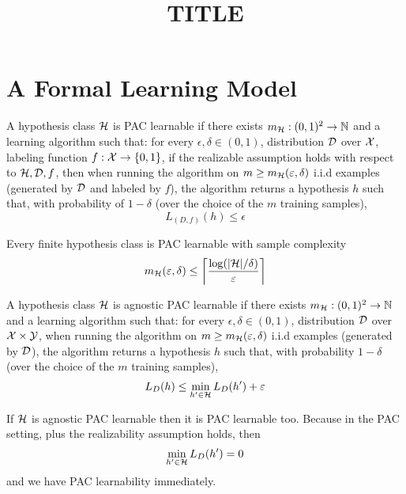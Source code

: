 \documentclass[a4paper, 10pt]{article}
\title{TITLE}
\begin{document}
    \createintro
    \setcounter{section}{2}
    \section{A Formal Learning Model}
    \begin{definition}  
        A hypothesis class $\calh$ is PAC learnable if there exists $m_{\calh}: (0, 1)^2 \to \bbn$ and a learning algorithm such that: for every $\epsilon, \delta \in (0, 1)$, distribution $\cald$ over $\calx$, labeling function $f: \calx \to \{0, 1\}$, if the realizable assumption holds with respect to $\calh, \cald, f$, then when running the algorithm on $m \geq m_{\calh} (\epsilon, \delta)$ i.i.d examples (generated by $\cald$ and labeled by $f$), the algorithm returns a hypothesis $h$ such that, with probability of $1- \delta$ (over the choice of the $m$ training samples), 
        \begin{equation*}
            L_{(D, f)}(h) \leq \epsilon
        \end{equation*}
    \end{definition}

    \begin{corollary}
    Every finite hypothesis class is PAC learnable with sample complexity \begin{equation*}
    m_{\calh}(\epsilon, \delta) \leq \ceil*{\dfrac{\log(\abs{\calh}/\delta)}{\epsilon}}
    \end{equation*}
    \end{corollary}

    \begin{definition} 
    A hypothesis class $\calh$ is agnostic PAC learnable if there exists $m_{\calh}: (0, 1)^2 \to \bbn$ and a learning algorithm such that: for every $\epsilon, \delta \in (0, 1)$, distribution $\cald$ over $\calx \times \caly$, when running the algorithm on $m \geq m_{\calh} (\epsilon, \delta)$ i.i.d examples (generated by $\cald$), the algorithm returns a hypothesis $h$ such that, with probability $1- \delta$ (over the choice of the $m$ training samples), \begin{equation*}
    L_D(h) \leq \min_{h' \in \calh} L_D (h') + \epsilon
    \end{equation*}
    \end{definition}

    \begin{remark}
    If $\calh$ is agnostic PAC learnable then it is PAC learnable too. Because in the PAC setting, plus the realizability assumption holds, then \begin{equation*}
        \min_{h' \in \calh} L_D (h') = 0
    \end{equation*}
    and we have PAC learnability immediately.
    \end{remark}
\end{document}
